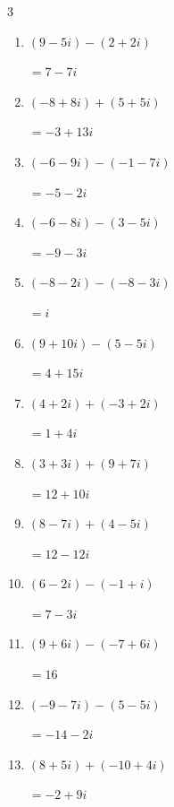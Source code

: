 \begin{multicols}{3}
\begin{enumerate}
        $\displaystyle =16-20i$

  \item $\displaystyle (9-5i) - (2+2i)$

        $\displaystyle =7-7i$

  \item $\displaystyle (-8+8i) + (5+5i)$

        $\displaystyle =-3+13i$

  \item $\displaystyle (-6-9i) - (-1-7i)$

        $\displaystyle =-5-2i$

  \item $\displaystyle (-6-8i) - (3-5i)$

        $\displaystyle =-9-3i$

\columnbreak %

  \item $\displaystyle (-8-2i) - (-8-3i)$

        $\displaystyle =i$

  \item $\displaystyle (9+10i) - (5-5i)$

        $\displaystyle =4+15i$

  \item $\displaystyle (4+2i) + (-3+2i)$

        $\displaystyle =1+4i$

  \item $\displaystyle (3+3i) + (9+7i)$

        $\displaystyle =12+10i$

  \item $\displaystyle (8-7i) + (4-5i)$

        $\displaystyle =12-12i$

  \item $\displaystyle (6-2i) - (-1+i)$

        $\displaystyle =7-3i$

  \item $\displaystyle (9+6i) - (-7+6i)$

        $\displaystyle =16$

  \item $\displaystyle (-9-7i) - (5-5i)$

        $\displaystyle =-14-2i$

  \item $\displaystyle (8+5i) + (-10+4i)$

        $\displaystyle =-2+9i$


\end{enumerate}
\end{multicols}

